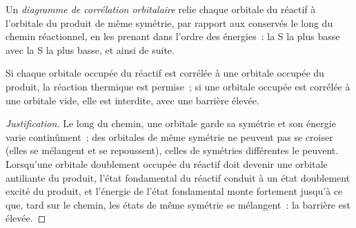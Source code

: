 \begin{definition}\label{def:b3:pericyclic:orbital-correlation}
Un \emph{diagramme de corrélation orbitalaire} relie
chaque orbitale du réactif à l'orbitale du produit de même symétrie, par
rapport aux  conservés le long du chemin réactionnel,
en les prenant dans l'ordre des énergies~: la S la plus basse avec la S la
plus basse, et ainsi de suite.
\end{definition}

\begin{proposition}\label{prop:b3:pericyclic:correlation}
Si chaque orbitale occupée du réactif est corrélée à une orbitale occupée
du produit, la réaction thermique est permise~; si une orbitale occupée est
corrélée à une orbitale vide, elle est interdite, avec une barrière élevée.
\end{proposition}

\begin{proof}[Justification]
Le long du chemin, une orbitale garde sa symétrie et son énergie varie
continûment~; des orbitales de même symétrie ne peuvent pas se croiser
(elles se mélangent et se repoussent), celles de symétries différentes le
peuvent. Lorsqu'une orbitale doublement occupée du réactif doit devenir une
orbitale antiliante du produit, l'état fondamental du réactif conduit à un
état doublement excité du produit, et l'énergie de l'état fondamental
monte fortement jusqu'à ce que, tard sur le chemin, les états de même
symétrie se mélangent~: la barrière est élevée.
\end{proof}

